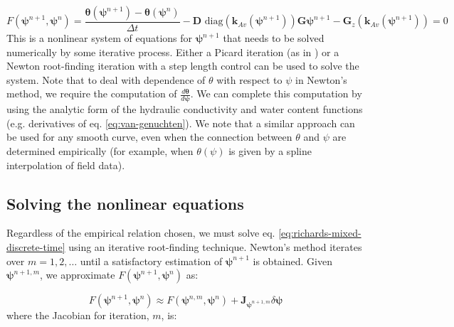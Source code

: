 \documentclass[preprint,review,3p,times,onecolumn,authoryear]{elsarticle}
\newcommand{\deriv}[2]{\frac{d #1}{d #2}}
\newcommand{\bftheta}{\boldsymbol{\theta}}
\newcommand{\bfpsi}{\boldsymbol{\psi}}
\newcommand{\nn}{^{n+1}}
\newcommand{\nnm}{^{n+1,m}}
\newcommand{\n}{^{n}}
\newcommand{\FF}{F}
\begin{document}
\begin{equation}
\label{eq:richards-mixed-discrete-time}
    F(\boldsymbol{\psi}^{n+1},\boldsymbol{\psi}^n) = \frac{
    \boldsymbol{\theta}(\boldsymbol{\psi}^{n+1}) - \boldsymbol{\theta}(\boldsymbol{\psi}^n)
    }{\Delta t}
    - \mathbf{D}
        \text{ diag}
        \left(
            \mathbf{k}_{Av}(\boldsymbol{\psi}^{n+1})
        \right)
    \mathbf{G} \boldsymbol{\psi}^{n+1}
    - \mathbf{G}_z
        \left(
            \mathbf{k}_{Av}(\boldsymbol{\psi}^{n+1})
        \right)
    =
    0
\end{equation}
This is a nonlinear system of equations for $\bfpsi\nn$ that needs to be solved numerically by some iterative process. Either a Picard iteration (as in \cite{Celia1990}) or a Newton root-finding iteration with a step length control can be used to solve the system. Note that to deal with dependence of $\theta$ with respect to $\psi$ in Newton's method, we require the computation of $\deriv{\bftheta}{\bfpsi}$. We can complete this computation by using the analytic form of the hydraulic conductivity and water content functions (e.g. derivatives of eq. \ref{eq:van-genuchten}). We note that a similar approach can be used for any smooth curve, even when the connection between $\theta$ and $\psi$ are determined empirically (for example, when $\theta(\psi)$ is given by a spline interpolation of field data).

\subsection{Solving the nonlinear equations}
Regardless of the empirical relation chosen, we must solve eq. \ref{eq:richards-mixed-discrete-time} using an iterative root-finding technique. Newton's method iterates over $m=1,2,\dots$ until a satisfactory estimation of $\bfpsi^{n+1}$ is obtained. Given $\bfpsi\nnm$, we approximate $\FF(\bfpsi^{n+1},\bfpsi\n)$ as:

\begin{equation}
\label{eq:richards-newton}
F(\boldsymbol{\psi}^{n+1},\boldsymbol{\psi}^n)
\approx
F(\boldsymbol{\psi}^{n,m},\boldsymbol{\psi}^n) +
\mathbf{J}_{\boldsymbol{\psi}^{n+1,m}} \delta \boldsymbol{\psi}
\end{equation}
where the Jacobian for iteration, $m$, is:
\end{document}
